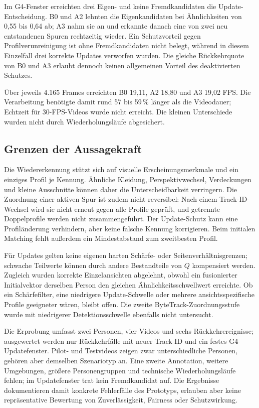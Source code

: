 \documentclass[runningheads,a4paper]{llncs}
\begin{document}
Im G4-Fenster erreichten drei Eigen- und keine Fremdkandidaten die Update-Entscheidung. B0 und A2 lehnten die Eigenkandidaten bei Ähnlichkeiten von 0,55 bis 0,64 ab; A3 nahm sie an und erkannte danach eine von zwei neu entstandenen Spuren rechtzeitig wieder. Ein Schutzvorteil gegen Profilverunreinigung ist ohne Fremdkandidaten nicht belegt, während in diesem Einzelfall drei korrekte Updates verworfen wurden. Die gleiche Rückkehrquote von B0 und A3 erlaubt dennoch keinen allgemeinen Vorteil des deaktivierten Schutzes.

Über jeweils 4.165 Frames erreichten B0 19,11, A2 18,80 und A3 19,02 FPS. Die Verarbeitung benötigte damit rund 57 bis 59\,\% länger als die Videodauer; Echtzeit für 30-FPS-Videos wurde nicht erreicht. Die kleinen Unterschiede wurden nicht durch Wiederholungsläufe abgesichert.

\subsection{Grenzen der Aussagekraft}

Die Wiedererkennung stützt sich auf visuelle Erscheinungsmerkmale und ein einziges Profil je Kennung. Ähnliche Kleidung, Perspektivwechsel, Verdeckungen und kleine Ausschnitte können daher die Unterscheidbarkeit verringern. Die Zuordnung einer aktiven Spur ist zudem nicht reversibel: Nach einem Track-ID-Wechsel wird sie nicht erneut gegen alle Profile geprüft, und getrennte Doppelprofile werden nicht zusammengeführt. Der Update-Schutz kann eine Profiländerung verhindern, aber keine falsche Kennung korrigieren. Beim initialen Matching fehlt au{\ss}erdem ein Mindestabstand zum zweitbesten Profil.

Für Updates gelten keine eigenen harten Schärfe- oder Seitenverhältnisgrenzen; schwache Teilwerte können durch andere Bestandteile von $Q$ kompensiert werden. Zugleich wurden korrekte Einzelansichten abgelehnt, obwohl ein fusionierter Initialvektor derselben Person den gleichen Ähnlichkeitsschwellwert erreichte. Ob ein Schärfefilter, eine niedrigere Update-Schwelle oder mehrere ansichtsspezifische Profile geeigneter wären, bleibt offen. Die zweite ByteTrack-Zuordnungsstufe wurde mit niedrigerer Detektionsschwelle ebenfalls nicht untersucht.

Die Erprobung umfasst zwei Personen, vier Videos und sechs Rückkehrereignisse; ausgewertet werden nur Rückkehrfälle mit neuer Track-ID und ein festes G4-Updatefenster. Pilot- und Testvideos zeigen zwar unterschiedliche Personen, gehören aber demselben Szenariotyp an. Eine zweite Annotation, weitere Umgebungen, grö{\ss}ere Personengruppen und technische Wiederholungsläufe fehlen; im Updatefenster trat kein Fremdkandidat auf. Die Ergebnisse dokumentieren damit konkrete Fehlerfälle des Prototyps, erlauben aber keine repräsentative Bewertung von Zuverlässigkeit, Fairness oder Schutzwirkung.
\end{document}
